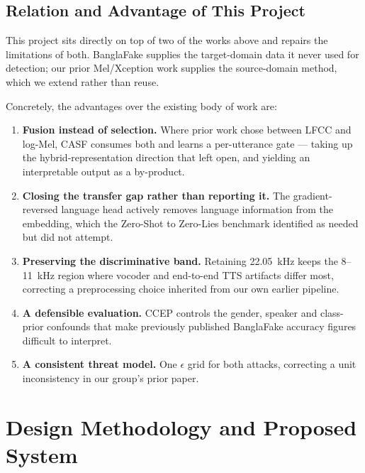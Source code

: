 \documentclass[conference]{IEEEtran}
\renewcommand{\cite}[1]{\unskip}
\begin{document}
\subsection{Relation and Advantage of This Project}
This project sits directly on top of two of the works above and repairs the
limitations of both. BanglaFake supplies the target-domain data it never used
for detection; our prior Mel/Xception work supplies the source-domain method,
which we extend rather than reuse.

Concretely, the advantages over the existing body of work are:

\begin{enumerate}
\item \textbf{Fusion instead of selection.} Where prior work chose between
      LFCC and log-Mel, CASF consumes both and learns a per-utterance gate ---
      taking up the hybrid-representation direction that \cite{ahmed2026melspec}
      left open, and yielding an interpretable output as a by-product.
\item \textbf{Closing the transfer gap rather than reporting it.} The
      gradient-reversed language head actively removes language information
      from the embedding, which the Zero-Shot to Zero-Lies benchmark
      identified as needed but did not attempt.
\item \textbf{Preserving the discriminative band.} Retaining 22.05~kHz keeps
      the 8--11~kHz region where vocoder and end-to-end TTS artifacts differ
      most, correcting a preprocessing choice inherited from our own earlier
      pipeline.
\item \textbf{A defensible evaluation.} CCEP controls the gender, speaker and
      class-prior confounds that make previously published BanglaFake accuracy
      figures difficult to interpret.
\item \textbf{A consistent threat model.} One $\epsilon$ grid for both
      attacks, correcting a unit inconsistency in our group's prior paper.
\end{enumerate}

\section{Design Methodology and Proposed System}
\end{document}
